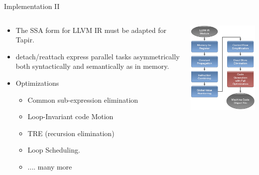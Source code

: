 \documentclass{beamer}
\begin{document}
\begin{frame}{Implementation II}
\begin{columns}
\begin{column}{0.7\textwidth}
\begin{itemize}
    \item The SSA form for LLVM IR must be adapted for Tapir.
    \item detach/reattach express parallel tasks asymmetrically  both  syntactically and semantically as in memory.
    \item Optimizations
    \begin{itemize}
        \item Common sub-expression elimination
        \item Loop-Invariant code Motion
        \item TRE (recursion elimination)
        \item Loop Scheduling.
        \item .... many more
    \end{itemize}
    
    \end{itemize}
    \end{column}
    \begin{column}{0.3\textwidth}
    \includegraphics[width=\textwidth]{optp}
    \end{column}
    \end{columns}
    
\end{frame}
\end{document}
